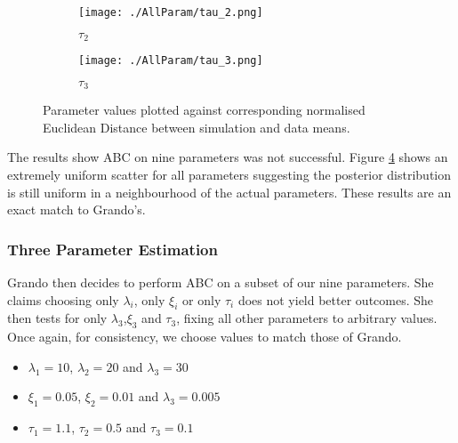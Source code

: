 \begin{figure}
\begin{subfigure}{.3\textwidth}
                \label{allp:tau1}
            \end{subfigure}
            \begin{subfigure}{.3\textwidth}  
                \centering
                \texttt{[image: ./AllParam/tau\_2.png]}
                \caption{$\tau_2$ }
                \label{allp:tau2}
            \end{subfigure}
            \begin{subfigure}{.3\textwidth}
                \centering
                \texttt{[image: ./AllParam/tau\_3.png]}
                \caption{$\tau_3$ }
                \label{allp:tau3}
            \end{subfigure}

            \caption{Parameter values plotted against corresponding normalised Euclidean Distance between simulation and data means.}
            \label{allp}
        \end{figure}
            
        The results show ABC on nine parameters was not successful. Figure \ref{allp} shows an extremely uniform scatter for all parameters suggesting the posterior distribution is still uniform in a neighbourhood of the actual parameters. These results are an exact match to Grando's. 



        \subsubsection{Three Parameter Estimation}
        \label{Replicating_Existing_Rainfall_Model:Replicating_Grando:Results:Three_Parameter_Estimation}
        
        Grando then decides to perform ABC on a subset of our nine parameters. She claims choosing only  $\lambda_i$, only $\xi_i$ or only $\tau_i$ does not yield better outcomes. She then tests for only $\lambda_3$,$\xi_3$ and $\tau_3$, fixing all other parameters to arbitrary values. Once again, for consistency, we choose values to match those of Grando.

        \begin{itemize}
            \item $\lambda_1 = 10$, $\lambda_2 = 20$ and $\lambda_3 =30$
            \item $\xi_1 = 0.05$, $\xi_2 = 0.01 $ and $\lambda_3 =0.005$
            \item $\tau_1 =1.1$, $\tau_2 = 0.5$ and $\tau_3 =0.1$
        \end{itemize}


